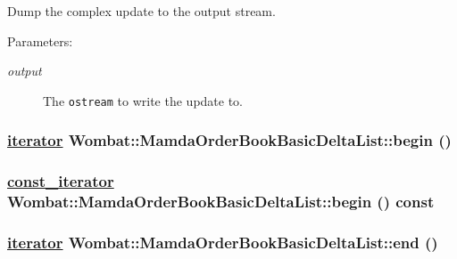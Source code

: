 Dump the complex update to the output stream. 

\begin{Desc}
\item[Parameters:]
\begin{description}
\item[{\em output}]The {\tt ostream} to write the update to. \end{description}
\end{Desc}
\hypertarget{classWombat_1_1MamdaOrderBookBasicDeltaList_3f3f6c9249cde8c9505e07ad9fdfd915}{
\subsubsection[begin]{\setlength{\rightskip}{0pt plus 5cm}\hyperlink{classWombat_1_1MamdaOrderBookBasicDeltaList_1_1iterator}{iterator} Wombat::Mamda\-Order\-Book\-Basic\-Delta\-List::begin ()}}
\label{classWombat_1_1MamdaOrderBookBasicDeltaList_3f3f6c9249cde8c9505e07ad9fdfd915}


\hypertarget{classWombat_1_1MamdaOrderBookBasicDeltaList_2b566cb610ada343789d75df72031bb3}{
\subsubsection[begin]{\setlength{\rightskip}{0pt plus 5cm}\hyperlink{classWombat_1_1MamdaOrderBookBasicDeltaList_1_1iterator}{const\_\-iterator} Wombat::Mamda\-Order\-Book\-Basic\-Delta\-List::begin () const}}
\label{classWombat_1_1MamdaOrderBookBasicDeltaList_2b566cb610ada343789d75df72031bb3}


\hypertarget{classWombat_1_1MamdaOrderBookBasicDeltaList_ea13d67de0766413616ddb6274e2bc18}{
\subsubsection[end]{\setlength{\rightskip}{0pt plus 5cm}\hyperlink{classWombat_1_1MamdaOrderBookBasicDeltaList_1_1iterator}{iterator} Wombat::Mamda\-Order\-Book\-Basic\-Delta\-List::end ()}}
\label{classWombat_1_1MamdaOrderBookBasicDeltaList_ea13d67de0766413616ddb6274e2bc18}


